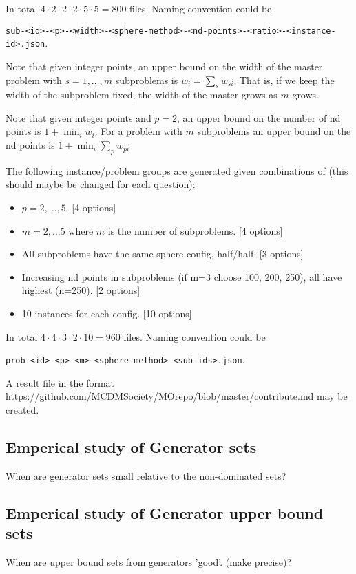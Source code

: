In total $4 \cdot 2 \cdot 2 \cdot 2 \cdot 5 \cdot 5 = 800$ files. Naming convention could be 

\verb|sub-<id>-<p>-<width>-<sphere-method>-<nd-points>-<ratio>-<instance-id>.json|.


Note that given integer points, an upper bound on the width of the master problem with $s = 1,\ldots, m$ subproblems is $w_i = \sum_s w_{si}$. That is, if we keep the width of the subproblem fixed, the width of the master grows as $m$ grows. 

Note that given integer points and $p=2$, an upper bound on the number of nd points is $1 + \min_i w_i$. For a problem with $m$ subproblems an upper bound on the nd points is $1 + \min_i \sum_p w_{pi}$

The following instance/problem groups are generated given combinations of (this should maybe be changed for each question):

\begin{itemize}
    \item $p=2,\ldots, 5$. [4 options]
    \item $m=2,\ldots 5$ where $m$ is the number of subproblems. [4 options]
    \item All subproblems have the same sphere config, half/half. [3 options]
    \item Increasing nd points in subproblems (if m=3 choose 100, 200, 250), all have highest (n=250). [2 options]
    \item 10 instances for each config. [10 options]
\end{itemize}

In total $4 \cdot 4 \cdot 3 \cdot 2 \cdot 10 = 960$ files. Naming convention could be 

\verb|prob-<id>-<p>-<m>-<sphere-method>-<sub-ids>.json|.

A result file in the format https://github.com/MCDMSociety/MOrepo/blob/master/contribute.md may be created.



\subsection{Emperical study of Generator sets}
When are generator sets small relative to the non-dominated sets?

\subsection{Emperical study of Generator upper bound sets}
When are upper bound sets from generators 'good'. (make precise)?


